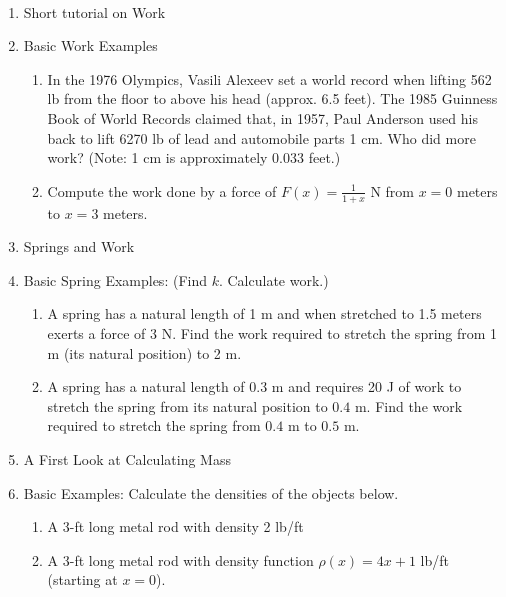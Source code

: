 \documentclass[11pt,fleqn]{article}
\begin{document}
\renewcommand{\headrulewidth}{0pt}
\newcommand{\blank}[1]{\rule{#1}{0.75pt}}
\newcommand{\bc}{\begin{center}}
\newcommand{\ec}{\end{center}}
\renewcommand{\d}{\displaystyle}

\vspace*{-0.7in}

\begin{center}
  \large
  \\
 
\end{center}

\begin{enumerate}
\item Short tutorial on Work

\vfill

\item Basic Work Examples
	\begin{enumerate}
	\item In the 1976 Olympics, Vasili Alexeev set a world record when lifting 562 lb from the floor to above his head (approx. 6.5 feet). The 1985 Guinness Book of World Records claimed that, in 1957, Paul Anderson used his back to lift 6270 lb of lead and automobile parts 1 cm. Who did more work? (Note: 1 cm is approximately 0.033 feet.)
	\vfill
	\item Compute the work done by a force of $F(x)=\frac{1}{1+x}$ N from $x=0$ meters to $x=3$ meters.
	\vfill
	\end{enumerate}
\item Springs and Work
\vfill
\newpage
\item Basic Spring Examples: (Find $k$. Calculate work.)\\
\begin{enumerate}
	\item A spring has a natural length of 1 m and when stretched to 1.5 meters exerts a force of 3 N. Find the work required to stretch the spring from 1 m (its natural position) to 2 m.\\
	\vfill
	\item A spring has a natural length of $0.3$ m and requires 20 J of work to stretch the spring from its natural position to $0.4$ m. Find the work required to stretch the spring from $0.4$ m  to $0.5$ m.
	\vfill
	\end{enumerate}

\item A First Look at Calculating Mass

\vfill

\item Basic Examples: Calculate the densities of the objects below.
	\begin{enumerate}
	\item A 3-ft long metal rod with density 2 lb/ft
	\vfill
	\item A 3-ft long metal rod with density function $\rho(x)=4x+1$ lb/ft (starting at $x=0$). 
	\vfill
	\end{enumerate} 
	
\end{enumerate}
\end{document}
